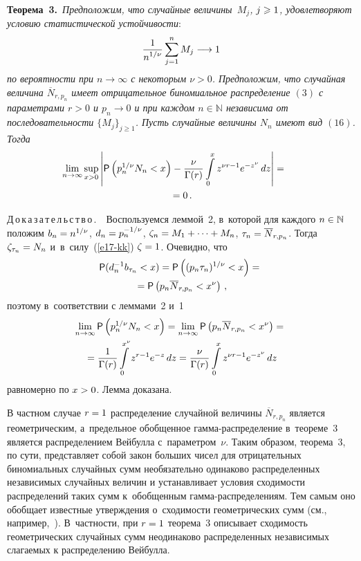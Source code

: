 \begin{multicols}{2}
\smallskip

\noindent
\textbf{Теорема~3.}\ \textit{Предположим, что случайные величины~$M_j$,
$j\hm\geqslant1$, удовлетворяют условию статистической устойчивости}:
\begin{equation}
\displaystyle\frac{\displaystyle 1\mathstrut}{\displaystyle n^{1/\nu}\mathstrut}\sum\limits_{j=1}^nM_j\longrightarrow 1
\label{e17-kk}
\end{equation}
\textit{по вероятности при $n\to\infty$ с некоторым $\nu>0$. Предположим,
что случайная величина $\overline N_{r,p_n}$ имеет отрицательное
биномиальное распределение $(3)$ с параметрами $r>0$ и $p_n\to 0$ и
при каждом $n\in\mathbb{N}$ независима от последовательности
$\{M_j\}_{j\geqslant1}$. Пусть случайные величины $N_n$ имеют вид $(16)$.
Тогда}
\begin{multline*}
\hspace*{-13.27338pt}\lim\limits_{n\to\infty}\sup\limits_{x>0}\left\vert {\sf
P}\left(p_n^{1/\nu}N_n<x\right)-\fr{\nu}{\Gamma(r)}\int\limits_{0}^{x}z^{\nu
r-1}e^{-z^{\nu}}\,dz\right\vert={}\\
{}=0\,.
\end{multline*}

\smallskip

\noindent
Д\,о\,к\,а\,з\,а\,т\,е\,л\,ь\,с\,т\,в\,о\,.\ \ 
Воспользуемся леммой~2, в~которой для каждого
$n\hm\in\mathbb{N}$ положим $b_n\hm=n^{1/\nu}$, $d_n\hm=p_n^{-1/\nu}$,
$\zeta_n\hm=M_1+\cdots+M_n$, $\tau_n\hm=\overline N_{r,p_n}$. Тогда
$\zeta_{\tau_n}\hm=N_n$ и~в~силу~(\ref{e17-kk}) $\zeta\hm=1$. Очевидно, что
\begin{multline*}
{\sf P}(d_n^{-1}b_{\tau_n}<x)={\sf
P}\left((p_n\tau_n)^{1/\nu}<x\right)={}\\
{}={\sf P}\left(p_n\overline
N_{r,p_n}<x^{\nu}\right)\,,
\end{multline*}
поэтому в~соответствии с леммами~2 и~1
\begin{multline*}
\lim\limits_{n\to\infty}{\sf P}\left(p_n^{1/\nu}N_n<x\right)=
\lim\limits_{n\to\infty}{\sf
P}\left(p_n\overline
N_{r,p_n}<x^{\nu}\right)={}\\
{}=\displaystyle\frac{\displaystyle 1\mathstrut}{\displaystyle \Gamma(r)\mathstrut}\int\limits_{0}^{x^{\nu}}z^{r-1}e^{-z}\,dz=
\displaystyle\frac{\displaystyle \nu\mathstrut}{\displaystyle \Gamma(r)\mathstrut}\int\limits _{0}^{x}z^{\nu r-1}e^{-z^{\nu}}\,dz
\end{multline*}
равномерно по $x\hm>0$. Лемма доказана.

\smallskip

В частном случае $r\hm=1$ распределение случайной величины $\overline
N_{r,p_n}$ является геометрическим, а~предельное обобщенное
гам\-ма-рас\-пре\-де\-ле\-ние в~тео\-ре\-ме~3 является распределением Вейбулла 
с~параметром~$\nu$. Таким образом, теорема~3, по сути, представляет
собой закон больших чисел для отрицательных биномиальных случайных
сумм необязательно одинаково распределенных независимых случайных
величин и устанавливает условия сходимости распределений таких сумм
к~обобщенным гам\-ма-рас\-пре\-де\-ле\-ни\-ям. Тем самым оно обобщает известные
утверждения о~сходимости гео\-мет\-ри\-че\-ских сумм (см., например,~\cite{Kalashnikov1997}). 
В~част\-ности, при $r\hm=1$ тео\-ре\-ма~3 описывает
сходимость гео\-мет\-ри\-че\-ских случайных сумм неодинаково распределенных
независимых слагаемых к распределению Вей\-булла.


\end{multicols}
